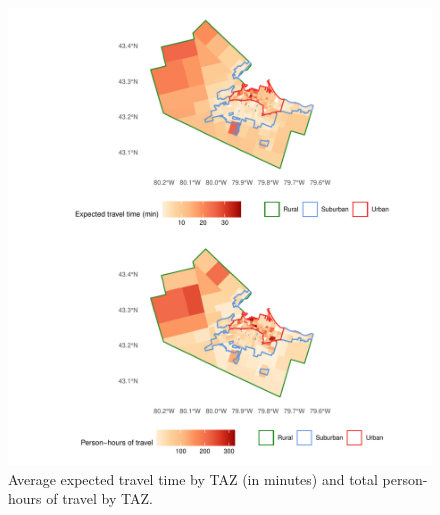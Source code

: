 \documentclass[]{elsarticle} %
\begin{document}
\begin{figure}

{\centering \includegraphics{Accessibility-Vaccination-Sites-Hamilton_files/figure-latex/figure-maps-baseline-1} 

}

\caption{\label{fig:maps-baseline}Average expected travel time by TAZ (in minutes) and total person-hours of travel by TAZ.}\label{fig:figure-maps-baseline}
\end{figure}
\end{document}
